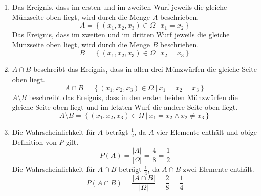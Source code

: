 \documentclass[a4paper]{scrartcl}
\begin{document}
\begin{enumerate}[label=\bfseries\arabic*.]
\begin{enumerate}[label=(\alph*)]
            \item
                Das Ereignis, dass im ersten und im zweiten Wurf jeweils die
                gleiche Münzseite oben liegt, wird durch die Menge $A$
                beschrieben.
                \begin{equation}
                    A = \left\{
                        (x_1, x_2, x_3) \in \Omega \ \vert \ 
                        x_1 = x_2
                    \right\}
                \end{equation}
                Das Ereignis, dass im zweiten und im dritten Wurf jeweils die
                gleiche Münzseite oben liegt, wird durch die Menge $B$
                beschrieben.
                \begin{equation}
                    B = \left\{
                        (x_1, x_2, x_3) \in \Omega \ \vert \ 
                        x_2 = x_3
                    \right\}
                \end{equation}

            \item
                $A \cap B$  beschreibt das Ereignis, dass in allen drei
                Münzwürfen die gleiche Seite oben liegt.
                \begin{equation}
                    A \cap B = \left\{
                        (x_1, x_2, x_3) \in \Omega \ \vert \ 
                        x_1 = x_2 = x_3
                    \right\}
                \end{equation}
                $A \setminus B$ beschreibt das Ereignis, dass in den ersten
                beiden Münzwürfen die gleiche Seite oben liegt und im letzten
                Wurf die andere Seite oben liegt.
                \begin{equation}
                    A \setminus B = \left\{
                        (x_1, x_2, x_3) \in \Omega \ \vert \ 
                        x_1 = x_2 \land x_2 \neq x_3
                    \right\}
                \end{equation}

            \item
                Die Wahrscheinlichkeit für $A$ beträgt $\frac{1}{2}$, da $A$
                vier Elemente enthält und obige Definition von $P$ gilt.
                \begin{equation}
                    P(A) = \frac{|A|}{|\Omega|} = \frac{4}{8} = \frac{1}{2}
                \end{equation}
                Die Wahrscheinlichkeit für $A \cap B$ beträgt $\frac{1}{4}$,
                da $A \cap B$ zwei Elemente enthält.
                \begin{equation}
                    P(A \cap B) = \frac{|A \cap B|}{|\Omega|}
                    = \frac{2}{8} = \frac{1}{4}
                \end{equation}

        \end{enumerate}

\end{enumerate}
\end{document}
